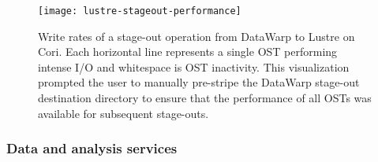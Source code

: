 \begin{figure}[t]
    \centering
    \texttt{[image: lustre-stageout-performance]}
    \vspace{-.3in}
    \caption{Write rates of a stage-out operation from DataWarp to Lustre on Cori.  Each horizontal line represents a single OST performing intense I/O and whitespace is OST inactivity.  This visualization prompted the user to manually pre-stripe the DataWarp stage-out destination directory to ensure that the performance of all OSTs was available for subsequent stage-outs.}
    \label{fig:lustre-heatmap}
    \vspace{-.2in}
\end{figure}

\subsubsection{Data and analysis services}